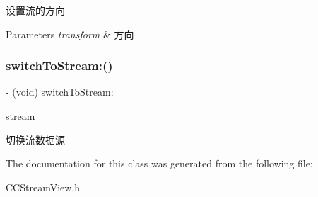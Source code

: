 设置流的方向


\begin{DoxyParams}{Parameters}
{\em transform} & 方向 \\
\hline
\end{DoxyParams}
\mbox{\label{interface_c_c_stream_view_a93cd41f06e817749a0ea635151333688}} 
\subsubsection{\texorpdfstring{switch\+To\+Stream\+:()}{switchToStream:()}}
{\footnotesize\ttfamily -\/ (void) switch\+To\+Stream\+: \begin{DoxyParamCaption}\item[{(\hyperlink{interface_c_c_stream}{C\+C\+Stream} $\ast$)}]{stream }\end{DoxyParamCaption}}

切换流数据源 

The documentation for this class was generated from the following file\+:\begin{DoxyCompactItemize}
\item 
C\+C\+Stream\+View.\+h\end{DoxyCompactItemize}
